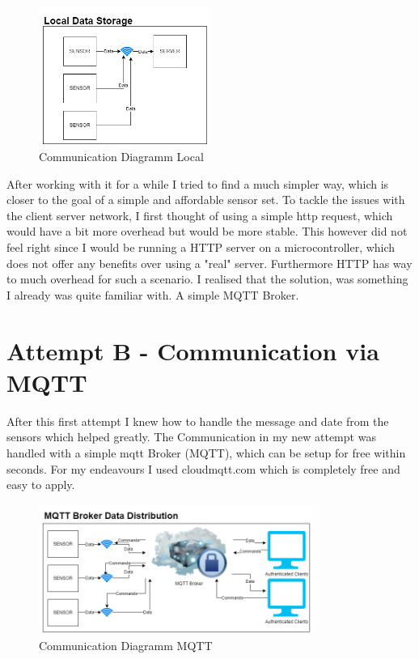 \begin{figure}[h]
  \begin{center}
\includegraphics[width=0.5\textwidth]{images/CommunicationDiagrammLocal.png}
  \end{center}
  \caption{Communication Diagramm Local}
  \label{fig:CommunicationDiagrammLocal}
\end{figure}
After working with it for a while I tried to find a much simpler way, which is closer to the goal of a simple and affordable sensor set. To tackle the issues with the client server network, I first thought of using a simple http request, which would have a bit more overhead but would be more stable. This however did not feel right since I would be running a HTTP server on a microcontroller, which does not offer any benefits over using a "real" server. Furthermore HTTP has way to much overhead for such a scenario. I realised that the solution, was something I already was quite familiar with. A simple MQTT Broker. 



\section{Attempt B - Communication via MQTT}

After this first attempt I knew how to handle the message and date from the sensors which helped greatly. 
The Communication in my new attempt was handled with a simple \acrshort{mqtt} Broker (\gls{MQTT}), which can be setup for free within seconds. For my endeavours I used cloudmqtt.com which is completely free and easy to apply. 


\begin{figure}[h]
  \begin{center}
\includegraphics[width=0.8\textwidth]{images/CommunicationDiagrammMQTT.png}
  \end{center}
  \caption{Communication Diagramm MQTT}
  \label{fig:CommunicationDiagrammMQTT}
\end{figure}

